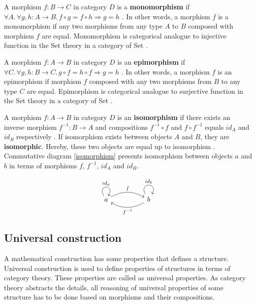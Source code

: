 \documentclass[article]{aaltoseries}
\begin{document}
    A morphism $f: B \rightarrow C$ in category $D$ is a \textbf{monomorphism}
    if $\forall A.\,\forall g, h: A \rightarrow B.\,f \circ g = f \circ h
    \Rightarrow g = h$ \cite{barr1990category, pierce1991basic}. In other words,
    a morphism $f$ is a monomorphism if any two morphisms from any type $A$ to
    $B$ composed with morphism $f$ are equal. Monomorphism is categorical
    analogue to injective function in the Set theory in a category of Set
    \cite{barr1990category, pierce1991basic}.

    A morphism $f: A \rightarrow B$ in category $D$ is an \textbf{epimorphism}
    if $\forall C.\,\forall g, h: B \rightarrow C.\,g \circ f = h \circ f
    \Rightarrow g = h$ \cite{barr1990category, pierce1991basic}. In other words,
    a morphism $f$ is an epimorphism if morphism $f$ composed with any two
    morphisms from $B$ to any type $C$ are equal. Epimorphism is categorical
    analogue to surjective function in the Set theory in a category of Set
    \cite{barr1990category, pierce1991basic}.

    A morphism $f: A \rightarrow B$ in category $D$ is an \textbf{isomorphism}
    if there exists an inverse morphism $f^{-1}: B \rightarrow A$ and
    compositions $f^{-1} \circ f$ and $f \circ f^{-1}$ equals $id_A$ and $id_B$
    respectively \cite{barr1990category, pierce1991basic}. If isomorphism exists
    between objects $A$ and $B$, they are \textbf{isomorphic}. Hereby, these two
    objects are equal up to isomorphism \cite{pierce1991basic}. Commutative diagram
    \ref{isomorphism} presents isomorphism between objects $a$ and $b$ in terms
    of morphisms $f$, $f^{-1}$, $id_A$ and $id_B$.

    \begin{equation}
      \label{isomorphism}
      \begin{tikzcd}[row sep=huge, column sep=huge]
        a \arrow[r, bend left, "f"]
        \arrow[loop above, distance=2em, in=60, out=120, "id_a"]
        & b \arrow[l, bend left, "f^{-1}"]
        \arrow[loop above, distance=2em, in=60, out=120, "id_b"]
      \end{tikzcd}
    \end{equation}


  \subsection{Universal construction} 
    A mathematical construction has some properties that defines a structure.
    Universal construction is used to define properties of structures in terms
    of category theory. These properties are called as universal properties. As
    category theory abstracts the details, all reasoning of universal properties
    of some structure has to be done based on morphisms and their compositions.
 
\end{document}
